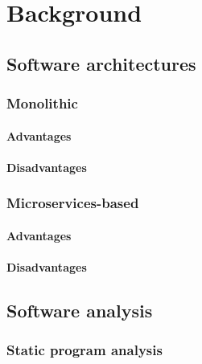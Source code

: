 \documentclass[12pt,a4paper]{report}
\begin{document}
\chapter{Background} \label{chap:background}





\section{Software architectures} \label{sect:background-architecture}




\subsection{Monolithic}



\subsubsection{Advantages}



\subsubsection{Disadvantages}



\subsection{Microservices-based}



\subsubsection{Advantages}



\subsubsection{Disadvantages}




\section{Software analysis} \label{sect:background-program-analysis}

\subsection{Static program analysis}
\end{document}

